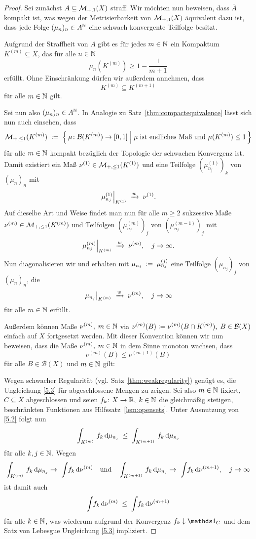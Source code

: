 \documentclass[../main/main.tex]{subfiles}
\begin{document}
	\begin{proof}
		Sei zunächst $A \subseteq \mathcal{M}_{+,1}(X)$ straff. Wir möchten nun beweisen, dass $\overline{A}$ 
		kompakt ist, was wegen der Metrisierbarkeit von $\mathcal{M}_{+,1}(X)$ äquivalent dazu ist,
		dass jede Folge $(\mu_n)_n \in A^{\mathbb{N}}$ eine schwach konvergente Teilfolge besitzt. 
		
		Aufgrund der Straffheit von $A$ gibt es für jedes $m \in \mathbb{N}$ ein Kompaktum $K^{(m)} \subseteq X$, 
		das für alle $n \in \mathbb{N}$
		\[ \mu_n(K^{(m)}) \geq 1 - \frac{1}{m+1} \label{5.1} \tag{5.1} \]
		erfüllt. Ohne Einschränkung dürfen wir außerdem annehmen, dass 
		\[ K^{(m)} \subseteq K^{(m+1)} \label{5.2} \tag{5.2} \] 
		für alle $m \in \mathbb{N}$ gilt.
		
		Sei nun also $(\mu_n)_n \in A^{\mathbb{N}}$.
		In Analogie zu Satz~\ref{thm:compactequivalence} lässt sich nun auch einsehen, dass 
		\[ \mathcal{M}_{+,\leq 1}(K^{(m)}) \; \vcentcolon = \; \left\{\, \mu \colon \mathcal{B}(K^{(m)}) \to [0,1] \; \middle| \; \mu \; 
			\text{ist endliches Maß und } \mu(K^{(m)}) \leq 1 \,\right\} \]
		für alle $m \in \mathbb{N}$ kompakt bezüglich der Topologie der schwachen Konvergenz ist. Damit existiert ein Maß 
		$\nu^{(1)} \in \mathcal{M}_{+,\leq 1}(K^{(1)})$ und eine Teilfolge $(\mu_{n_j}^{(1)})_k$ von $(\mu_n)_n$ mit
		\[ \left.\mu_{n_j}^{(1)}\right|_{K^{(1)}} \; \xrightarrow{w} \; \nu^{(1)} \text{.} \]
		Auf dieselbe Art und Weise findet man nun für alle $m\geq 2$ sukzessive Maße 
		$\nu^{(m)} \in \mathcal{M}_{+,\leq 1}(K^{(m)})$ und Teilfolgen $(\mu_{n_j}^{(m)})_j$ von $(\mu_{n_j}^{(m-1)})_j$ mit
		\[ \left.\mu_{n_j}^{(m)}\right|_{K^{(m)}} \; \xrightarrow{w} \; \nu^{(m)}, \quad j \to \infty \text{.} \]
		Nun diagonalisieren wir und erhalten mit $\mu_{n_j} \; \vcentcolon = \; \mu_{n_j}^{(j)}$ eine Teilfolge 
		$(\mu_{n_j})_j$ von $(\mu_n)_n$, die
		\[ \left.\mu_{n_j}\right|_{K^{(m)}} \; \xrightarrow{w} \; \nu^{(m)}, \quad j \to \infty \]
		für alle $m \in \mathbb{N}$ erfüllt.
		
		Außerdem können Maße $\nu^{(m)}, \; m \in \mathbb{N}$ via 
		$\nu^{(m)}(B) \vcentcolon = \nu^{(m)}(B \cap K^{(m)}), \; B \in \mathcal{B}(X)$ einfach auf $X$ fortgesetzt werden. 
		Mit dieser Konvention können wir nun beweisen, dass die Maße
		$\nu^{(m)}, \; m \in \mathbb{N}$ in dem Sinne monoton wachsen, dass 
		\[ \nu^{(m)}(B) \leq \nu^{(m+1)}(B) \label{5.3} \tag{5.3} \]
		für alle $B \in \mathcal{B}(X)$ und $m \in \mathbb{N}$ gilt:
		
		Wegen schwacher Regularität (vgl. Satz~\ref{thm:weakregularity}) genügt es, die Ungleichung \eqref{5.3} 
		für abgeschlossene Mengen zu zeigen. Sei also $m \in \mathbb{N}$ fixiert, $C \subseteq X$ abgeschlossen 
		und seien $f_k \colon X \to \mathbb{R}, \; k \in \mathbb{N}$ die gleichmäßig stetigen, beschränkten Funktionen aus 
		Hilfssatz~\ref{lem:opensets}. Unter Ausnutzung von \eqref{5.2} folgt nun 
		\[ \int_{K^{(m)}} \, f_k \, \mathrm{d}\mu_{n_j} \; \leq \; \int_{K^{(m+1)}} \, f_k \, \mathrm{d}\mu_{n_j} \]
		für alle $k, j \in \mathbb{N}$. Wegen 
		\[ \measureint{K^{(m)}}{f_k}{\mu_{n_j}} \to \ \measureint{}{f_k}{\nu^{(m)}} \quad \text{und} 
		\quad \measureint{K^{(m+1)}}{f_k}{\mu_{n_j}} \to \ \measureint{}{f_k}{\nu^{(m+1)}}, \quad j \to \infty \]
		ist damit auch 
		\[ \int_{} \, f_k \, \mathrm{d}\nu^{(m)} \; \leq \; \int_{} \, f_k \, \mathrm{d}\nu^{(m+1)} \]
		für alle $k \in \mathbb{N}$, was wiederum aufgrund der Konvergenz $f_k \convdown \indfct_C$ und dem Satz von Lebesgue Ungleichung 
		\eqref{5.3} impliziert.
		

\end{proof}
\end{document}
